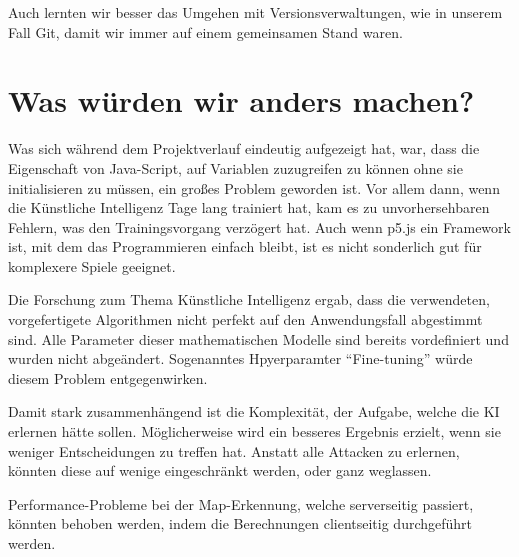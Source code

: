 Auch lernten wir besser das Umgehen mit Versionsverwaltungen, wie in unserem Fall Git, damit wir immer auf einem gemeinsamen Stand waren.



\section{Was würden wir anders machen?}
Was sich während dem Projektverlauf eindeutig aufgezeigt hat, war, dass die Eigenschaft von Java-Script, auf Variablen zuzugreifen zu können ohne sie initialisieren zu müssen, ein großes Problem geworden ist.
Vor allem dann, wenn die Künstliche Intelligenz Tage lang trainiert hat, kam es zu unvorhersehbaren Fehlern, was den Trainingsvorgang verzögert hat.
Auch wenn p5.js ein Framework ist, mit dem das Programmieren einfach bleibt, ist es nicht sonderlich gut für komplexere Spiele geeignet.

Die Forschung zum Thema Künstliche Intelligenz ergab, dass die verwendeten, vorgefertigete Algorithmen nicht perfekt auf den Anwendungsfall abgestimmt sind.
Alle Parameter dieser mathematischen Modelle sind bereits vordefiniert und wurden nicht abgeändert.
Sogenanntes Hpyerparamter ``Fine-tuning'' würde diesem Problem entgegenwirken.

Damit stark zusammenhängend ist die Komplexität, der Aufgabe, welche die KI erlernen hätte sollen.
Möglicherweise wird ein besseres Ergebnis erzielt, wenn sie weniger Entscheidungen zu treffen hat.
Anstatt alle Attacken zu erlernen, könnten diese auf wenige eingeschränkt werden, oder ganz weglassen.

Performance-Probleme bei der Map-Erkennung, welche serverseitig passiert, könnten behoben werden, indem
die Berechnungen clientseitig durchgeführt werden.